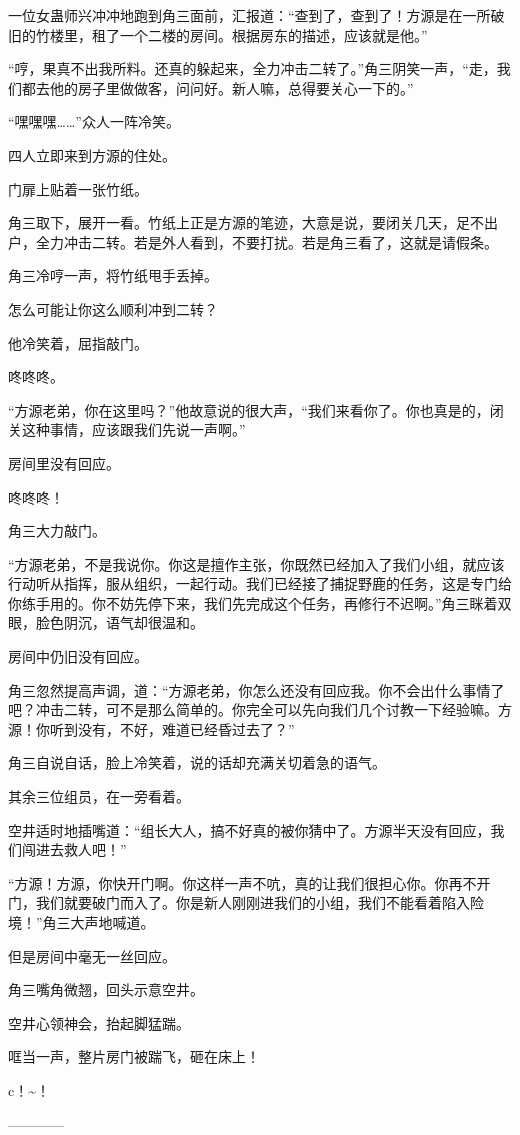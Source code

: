 \begin{this_body}
一位女蛊师兴冲冲地跑到角三面前，汇报道：“查到了，查到了！方源是在一所破旧的竹楼里，租了一个二楼的房间。根据房东的描述，应该就是他。”

“哼，果真不出我所料。还真的躲起来，全力冲击二转了。”角三阴笑一声，“走，我们都去他的房子里做做客，问问好。新人嘛，总得要关心一下的。”

“嘿嘿嘿……”众人一阵冷笑。

四人立即来到方源的住处。

门扉上贴着一张竹纸。

角三取下，展开一看。竹纸上正是方源的笔迹，大意是说，要闭关几天，足不出户，全力冲击二转。若是外人看到，不要打扰。若是角三看了，这就是请假条。

角三冷哼一声，将竹纸甩手丢掉。

怎么可能让你这么顺利冲到二转？

他冷笑着，屈指敲门。

咚咚咚。

“方源老弟，你在这里吗？”他故意说的很大声，“我们来看你了。你也真是的，闭关这种事情，应该跟我们先说一声啊。”

房间里没有回应。

咚咚咚！

角三大力敲门。

“方源老弟，不是我说你。你这是擅作主张，你既然已经加入了我们小组，就应该行动听从指挥，服从组织，一起行动。我们已经接了捕捉野鹿的任务，这是专门给你练手用的。你不妨先停下来，我们先完成这个任务，再修行不迟啊。”角三眯着双眼，脸色阴沉，语气却很温和。

房间中仍旧没有回应。

角三忽然提高声调，道：“方源老弟，你怎么还没有回应我。你不会出什么事情了吧？冲击二转，可不是那么简单的。你完全可以先向我们几个讨教一下经验嘛。方源！你听到没有，不好，难道已经昏过去了？”

角三自说自话，脸上冷笑着，说的话却充满关切着急的语气。

其余三位组员，在一旁看着。

空井适时地插嘴道：“组长大人，搞不好真的被你猜中了。方源半天没有回应，我们闯进去救人吧！”

“方源！方源，你快开门啊。你这样一声不吭，真的让我们很担心你。你再不开门，我们就要破门而入了。你是新人刚刚进我们的小组，我们不能看着陷入险境！”角三大声地喊道。

但是房间中毫无一丝回应。

角三嘴角微翘，回头示意空井。

空井心领神会，抬起脚猛踹。

哐当一声，整片房门被踹飞，砸在床上！

c！\~{}！

------------

\end{this_body}

